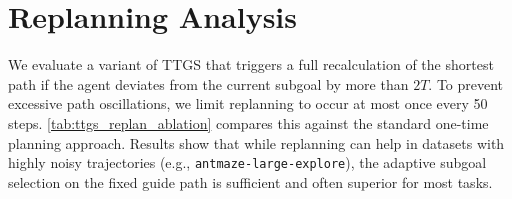 \documentclass{article} %
\begin{document}
\section{Replanning Analysis} \label{apdx:replan}

We evaluate a variant of TTGS that triggers a full recalculation of the shortest path if the agent deviates from the current subgoal by more than $2T$. To prevent excessive path oscillations, we limit replanning to occur at most once every 50 steps. \autoref{tab:ttgs_replan_ablation} compares this against the standard one-time planning approach. Results show that while replanning can help in datasets with highly noisy trajectories (e.g., \texttt{antmaze-large-explore}), the adaptive subgoal selection on the fixed guide path is sufficient and often superior for most tasks.
\end{document}
